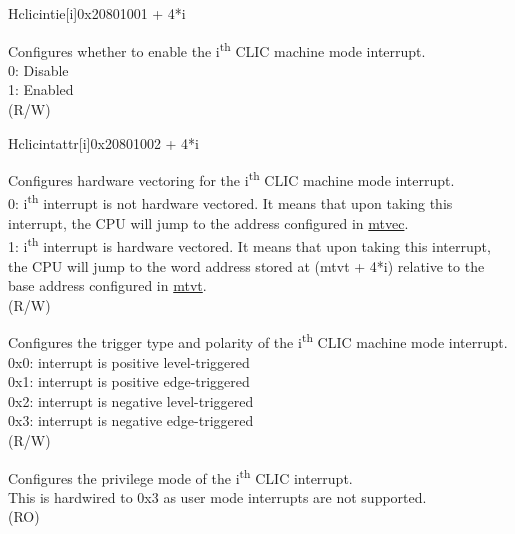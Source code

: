 \begin{register}{H}{{clicintie[i]}}{0x20801001 + 4*i}\label{regdesc:MCLICINTIE_REG_i}
%
%
\regnewline%
\begin{regdesc}
\begin{reglist}
\label{fielddesc:MCLICINTIE_i}\item [{IE[i]}] Configures whether to enable the i\textsuperscript{th} CLIC machine mode interrupt.\\
0: Disable \\
1: Enabled \\
 (R/W) \\
\end{reglist}
\end{regdesc}
\end{register}

\begin{register}{H}{{clicintattr[i]}}{0x20801002 + 4*i}\label{regdesc:MCLICINTATTR_REG_i}
%
%
%
%
\regnewline%
\begin{regdesc}
\begin{reglist}
\label{fielddesc:MCLICINTATTR_i_SHV}\item [{SHV}] Configures hardware vectoring for the i\textsuperscript{th} CLIC machine mode interrupt. \\
0: i\textsuperscript{th} interrupt is not hardware vectored. It means that upon taking this interrupt, the CPU will jump to the address configured in \hyperref[fielddesc:MTVECBASE]{mtvec}. \\
1: i\textsuperscript{th} interrupt is hardware vectored. It means that upon taking this interrupt, the CPU will jump to the word address stored at (mtvt + 4*i) relative to the base address configured in \hyperref[fielddesc:MTVTBASE]{mtvt}. \\
(R/W)
\label{fielddesc:MCLICINTATTR_i_TRIG}\item [{TRIG}] Configures the trigger type and polarity of the i\textsuperscript{th} CLIC machine mode interrupt. \\
0x0: interrupt is positive level-triggered \\
0x1: interrupt is positive edge-triggered \\
0x2: interrupt is negative level-triggered \\
0x3: interrupt is negative edge-triggered \\
(R/W)
\label{fielddesc:MCLICINTATTR_i_MODE}\item [{MODE}] Configures the privilege mode of the i\textsuperscript{th} CLIC interrupt. \\
This is hardwired to 0x3 as user mode interrupts are not supported.\\
(RO)
\end{reglist}
\end{regdesc}
\end{register}

